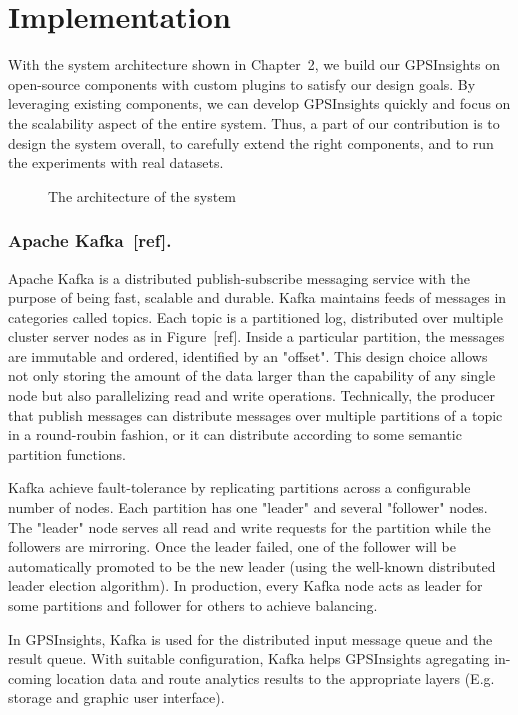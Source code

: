 \documentclass{acm_proc_article-sp}
\begin{document}
\section{Implementation} 

With the system architecture shown in Chapter~2, we build our GPSInsights on open-source components with custom plugins to satisfy our design goals. By leveraging existing components, we can develop GPSInsights quickly and focus on the scalability aspect of the entire system. Thus, a part of our contribution is to design the system overall, to carefully extend the right components, and to run the experiments with real datasets.  

\begin{figure}[!htb]
\centering
{}
\caption{The architecture of the system}
\end{figure}

\subsubsection{Apache Kafka~[ref].} 

Apache Kafka is a distributed publish-subscribe messaging service with the purpose of being fast, scalable and durable. Kafka maintains feeds of messages in categories called topics. Each topic is a partitioned log, distributed over multiple cluster server nodes as in Figure~[ref]. Inside a particular partition, the messages are immutable and ordered, identified by an "offset". This design choice allows not only storing the amount of the data larger than the capability of any single node but also parallelizing read and write operations. Technically, the producer that publish messages can distribute messages over multiple partitions of a topic in a round-roubin fashion, or it can distribute according to some semantic partition functions.

Kafka achieve fault-tolerance by replicating partitions across a configurable number of nodes. Each partition has one "leader" and several "follower" nodes. The "leader" node serves all read and write requests for the partition while the followers are mirroring. Once the leader failed, one of the follower will be automatically promoted to be the new leader (using the well-known distributed leader election algorithm). In production, every Kafka node acts as leader for some partitions and follower for others to achieve balancing. 

In GPSInsights, Kafka is used for the distributed input message queue and the result queue. With suitable configuration, Kafka helps GPSInsights agregating in-coming location data and route analytics results to the appropriate layers (E.g. storage and graphic user interface).
\end{document}
